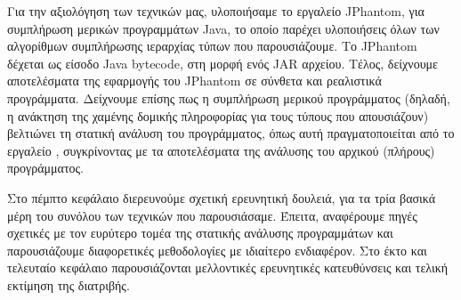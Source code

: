 Για την αξιολόγηση των τεχνικών μας, υλοποιήσαμε το εργαλείο {\en
  JPhantom}, για συμπλήρωση μερικών προγραμμάτων {\en Java}, το οποίο
παρέχει υλοποιήσεις όλων των αλγορίθμων συμπλήρωσης ιεραρχίας τύπων
που παρουσιάζουμε. Το {\en JPhantom} δέχεται ως είσοδο {\en Java
  bytecode}, στη μορφή ενός {\en JAR} αρχείου.
%
Τέλος, δείχνουμε αποτελέσματα της εφαρμογής του {\en JPhantom} σε
σύνθετα και ρεαλιστικά προγράμματα. Δείχνουμε επίσης πως η συμπλήρωση
μερικού προγράμματος (δηλαδή, η ανάκτηση της χαμένης δομικής
πληροφορίας για τους τύπους που απουσιάζουν) βελτιώνει τη στατική
ανάλυση του προγράμματος, όπως αυτή πραγματοποιείται από το εργαλείο
{\en \doop{}}, συγκρίνοντας με τα αποτελέσματα της ανάλυσης του
αρχικού (πλήρους) προγράμματος.



Στο πέμπτο κεφάλαιο διερευνούμε σχετική ερευνητική δουλειά, για τα
τρία βασικά μέρη του συνόλου των τεχνικών που παρουσιάσαμε. Έπειτα,
αναφέρουμε πηγές σχετικές με τον ευρύτερο τομέα της στατικής ανάλυσης
προγραμμάτων και παρουσιάζουμε διαφορετικές μεθοδολογίες με ιδιαίτερο
ενδιαφέρον.
%
Στο έκτο και τελευταίο κεφάλαιο παρουσιάζονται μελλοντικές ερευνητικές
κατευθύνσεις και τελική εκτίμηση της διατριβής.


